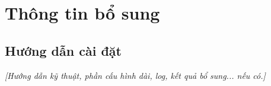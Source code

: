 \chapter{Thông tin bổ sung}
\section{Hướng dẫn cài đặt}
\textit{[Hướng dẫn kỹ thuật, phần cấu hình dài, log, kết quả bổ sung... nếu có.]}
